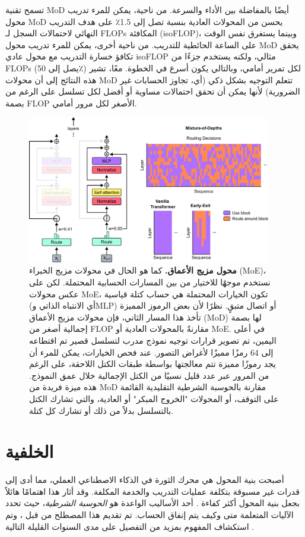 \documentclass[11pt, a4paper, onecolumn, logo, copyright]{googledeepmind}
\begin{document}
تسمح تقنية MoD أيضًا بالمفاضلة بين الأداء والسرعة. من ناحية، يمكن للمرء تدريب محول MoD يحسن من المحولات العادية بنسبة تصل إلى 1.5٪ على هدف التدريب النهائي لاحتمالات السجل لـ FLOPs المكافئة (isoFLOP)، وبينما يستغرق نفس الوقت على الساعة الحائطية للتدريب. من ناحية أخرى، يمكن للمرء تدريب محول MoD يحقق تكافؤ خسارة التدريب مع محول عادي isoFLOP مثالي، ولكنه يستخدم جزءًا من FLOPs (يصل إلى 50٪) لكل تمرير أمامي، وبالتالي يكون أسرع في الخطوة. معًا، تشير هذه النتائج إلى أن محولات MoD تتعلم التوجيه بشكل ذكي (أي، تجاوز الحسابات غير الضرورية) لأنها يمكن أن تحقق احتمالات مساوية أو أفضل لكل تسلسل على الرغم من بصمة FLOP الأصغر لكل مرور أمامي.

\begin{figure}[h]
\centering
\includegraphics[width=0.95\textwidth]{mod.png}
\caption{\textbf{محول مزيج الأعماق.} كما هو الحال في محولات مزيج الخبراء (MoE)، نستخدم موجهًا للاختيار من بين المسارات الحسابية المحتملة. لكن على عكس محولات MoE، تكون الخيارات المحتملة هي حساب كتلة قياسية (أي الانتباه الذاتي وMLP) أو اتصال متبقٍ. نظرًا لأن بعض الرموز المميزة تأخذ هذا المسار الثاني، فإن محولات مزيج الأعماق (MoD) لها بصمة إجمالية أصغر من FLOP مقارنةً بالمحولات العادية أو MoE. في أعلى اليمين، تم تصوير قرارات توجيه نموذج مدرب لتسلسل قصير تم اقتطاعه إلى 64 رمزًا مميزًا لأغراض التصور. عند فحص الخيارات، يمكن للمرء أن يجد رموزًا مميزة تتم معالجتها بواسطة طبقات الكتل اللاحقة، على الرغم من المرور عبر عدد قليل نسبيًا من الكتل الإجمالية خلال عمق النموذج. هذه ميزة فريدة من MoD مقارنة بالحوسبة الشرطية التقليدية القائمة على التوقف، أو المحولات "الخروج المبكر" أو العادية، والتي تشارك الكتل بالتسلسل بدلاً من ذلك أو تشارك كل كتلة.}
\label{fig:mixture-of-depths}
\end{figure}

\section{الخلفية}
أصبحت بنية المحول هي محرك الثورة في الذكاء الاصطناعي العملي، مما أدى إلى قدرات غير مسبوقة بتكلفة عمليات التدريب والخدمة المكلفة. وقد أثار هذا اهتمامًا هائلاً بجعل بنية المحول أكثر كفاءة \citep{tay_efficient, gupta2021compression}. أحد الأساليب الواعدة هو \textit{الحوسبة الشرطية}، حيث تحدد الآليات المتعلمة متى وكيف يتم إنفاق الحساب. تم تقديم هذا المصطلح من قبل \citet{bengio2013deep}، وتم استكشاف المفهوم بمزيد من التفصيل على مدى السنوات القليلة التالية \citep{bengio2013estimating, cho2014exponentially, graves_adaptive, jernite2017variable, bengio2016conditional, wang_skipnet}.
\end{document}

